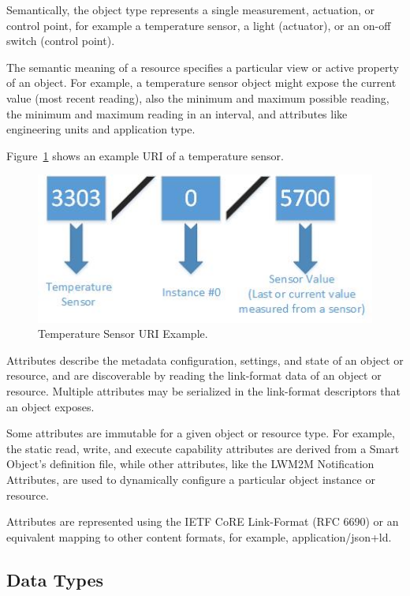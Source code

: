 \documentclass[peerreview, a4paper, 7pt]{IEEEtran}
\begin{document}
Semantically, the object type represents a single measurement, actuation, or control point, for example a temperature sensor, a light (actuator), or an on-off switch (control point).

The semantic meaning of a resource specifies a particular view or active property of an object. For example, a temperature sensor object might expose the current value (most recent reading), also the minimum and maximum possible reading, the minimum and maximum reading in an interval, and attributes like engineering units and application type.

Figure~\ref{temperature-uri-figure} shows an example URI of a temperature sensor. 

\begin{figure}[!t]
 \centering
 \includegraphics[scale=0.50]{temperature-uri.jpg}
 \caption{Temperature Sensor URI Example.}
 \label{temperature-uri-figure}
\end{figure}

Attributes describe the metadata configuration, settings, and state of an object or resource, and are discoverable by reading the link-format data of an object or resource. Multiple attributes may be serialized in the link-format descriptors that an object exposes. 

Some attributes are immutable for a given object or resource type. For example, the static read, write, and execute capability attributes are derived from a Smart Object's definition file, while other attributes, like the LWM2M Notification Attributes, are used to dynamically configure a particular object instance or resource.

Attributes are represented using the IETF CoRE Link-Format (RFC 6690) or an equivalent mapping to other content formats, for example, application/json+ld.

\subsection{Data Types}
\end{document}
